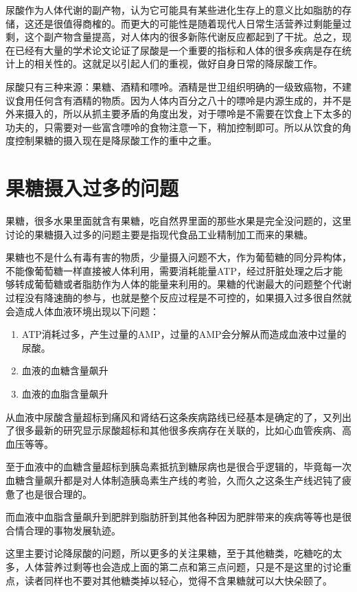 \documentclass[12pt,oneside]{book}
\begin{document}
尿酸作为人体代谢的副产物，认为它可能具有某些进化生存上的意义比如脂肪的存储，这还是很值得商榷的。而更大的可能性是随着现代人日常生活营养过剩能量过剩，这个副产物含量提高，对人体内的很多新陈代谢反应都起到了干扰。总之，现在已经有大量的学术论文论证了尿酸是一个重要的指标和人体的很多疾病是存在统计上的相关性的。这就足以引起人们的重视，做好自身日常的降尿酸工作。

尿酸只有三种来源：果糖、酒精和嘌呤。酒精是世卫组织明确的一级致癌物，不建议食用任何含有酒精的物质。因为人体内百分之八十的嘌呤是内源生成的，并不是外来摄入的，所以从抓主要矛盾的角度出发，对于嘌呤是不需要在饮食上下太多的功夫的，只需要对一些富含嘌呤的食物注意一下，稍加控制即可。所以从饮食的角度控制果糖的摄入现在是降尿酸工作的重中之重。



\section{果糖摄入过多的问题}
果糖，很多水果里面就含有果糖，吃自然界里面的那些水果是完全没问题的，这里讨论的果糖摄入过多的问题主要是指现代食品工业精制加工而来的果糖。

果糖也不是什么有毒有害的物质，少量摄入问题不大，作为葡萄糖的同分异构体，不能像葡萄糖一样直接被人体利用，需要消耗能量ATP，经过肝脏处理之后才能够转成葡萄糖或者脂肪作为人体的能量来利用的。果糖的代谢最大的问题整个代谢过程没有降速酶的参与，也就是整个反应过程是不可控的，如果摄入过多很自然就会造成人体血液环境出现以下问题：

\begin{enumerate}
\item ATP消耗过多，产生过量的AMP，过量的AMP会分解从而造成血液中过量的尿酸。
\item 血液的血糖含量飙升
\item 血液的血脂含量飙升
\end{enumerate}

从血液中尿酸含量超标到痛风和肾结石这条疾病路线已经基本是确定的了，\cite{疯狂的尿酸}又列出了很多最新的研究显示尿酸超标和其他很多疾病存在关联的，比如心血管疾病、高血压等等。

至于血液中的血糖含量超标到胰岛素抵抗到糖尿病也是很合乎逻辑的，毕竟每一次血糖含量飙升都是对人体制造胰岛素生产线的考验，久而久之这条生产线迟钝了疲惫了也是很合理的。

而血液中血脂含量飙升到肥胖到脂肪肝到其他各种因为肥胖带来的疾病等等也是很合情合理的事物发展轨迹。

这里主要讨论降尿酸的问题，所以更多的关注果糖，至于其他糖类，吃糖吃的太多，人体营养过剩等也会造成上面的第二点和第三点问题，只是不是这里的讨论重点，读者同样也不要对其他糖类掉以轻心，觉得不含果糖就可以大快朵颐了。
\end{document}

